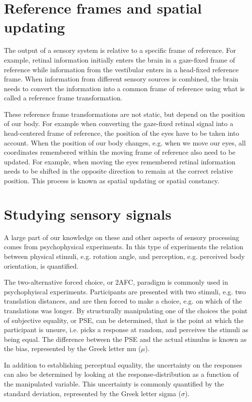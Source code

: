 \section{Reference frames and spatial updating}
The output of a sensory system is relative to a specific frame of reference. For example, retinal information initially enters the brain in a gaze-fixed frame of reference while information from the vestibular enters in a head-fixed reference frame. When information from different sensory sources is combined, the brain needs to convert the information into a common frame of reference using what is called a reference frame transformation.

These reference frame transformations are not static, but depend on the position of our body. For example when converting the gaze-fixed retinal signal into a head-centered frame of reference, the position of the eyes have to be taken into account. When the position of our body changes, e.g. when we move our eyes, all coordinates remembered within the moving frame of reference also need to be updated. For example, when moving the eyes remembered retinal information needs to be shifted in the opposite direction to remain at the correct relative position. This process is known as spatial updating or spatial constancy.

\section{Studying sensory signals}
A large part of  our knowledge on these and other aspects of sensory processing comes from psychophysical experiments. In this type of experiments the relation between physical stimuli, e.g. rotation angle, and perception, e.g. perceived body orientation, is quantified.

The two-alternative forced choice, or 2AFC, paradigm is commonly used in psychophyiscal experiments. Participants are presented with two stimuli, e.g. two translation distances, and are then forced to make a choice, e.g. on which of the translations was longer. By structurally manipulating one of the choices the point of subjective equality, or PSE, can be determined, that is the point at which the participant is unsure, i.e. picks a response at random, and perceives the stimuli as being equal. The difference between the PSE and the actual stimulus is known as the bias, represented by the Greek letter mu ($\mu$).

In addition to establishing perceptual equality, the uncertainty on the responses can also be determined by looking at the response-distribution as a function of the manipulated variable. This uncertainty is commonly quantified by the standard deviation, represented by the Greek letter sigma ($\sigma$).

